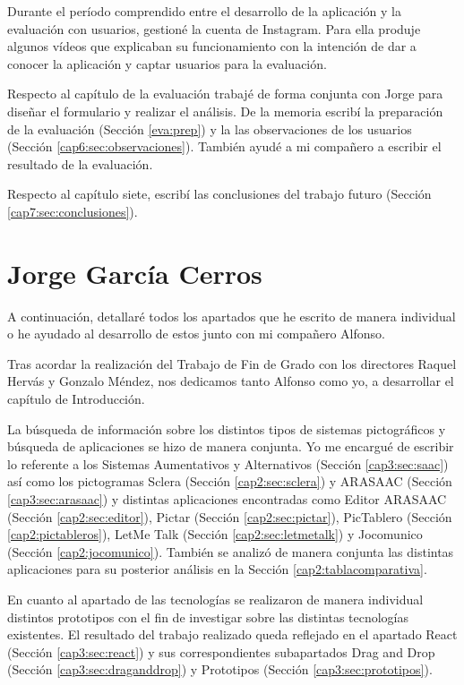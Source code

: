 Durante el período comprendido entre el desarrollo de la aplicación y la evaluación con usuarios, gestioné la cuenta de Instagram. Para ella produje algunos vídeos que explicaban su funcionamiento con la intención de dar a conocer la aplicación y captar usuarios para la evaluación. 

Respecto al capítulo de la evaluación trabajé de forma conjunta con Jorge para diseñar el formulario y realizar el análisis. De la memoria escribí la preparación de la evaluación (Sección \ref{eva:prep}) y la las observaciones de los usuarios (Sección \ref{cap6:sec:observaciones}). También ayudé a mi compañero a escribir el resultado de la evaluación. 

Respecto al capítulo siete, escribí las conclusiones del trabajo futuro (Sección \ref{cap7:sec:conclusiones}).



\section{Jorge García Cerros}

A continuación, detallaré todos los apartados que he escrito de manera individual o he ayudado al desarrollo de estos junto con mi compañero Alfonso.


Tras acordar la realización del Trabajo de Fin de Grado con los directores Raquel Hervás y Gonzalo Méndez, nos dedicamos tanto Alfonso como yo, a desarrollar el capítulo de Introducción.


La búsqueda de información sobre los distintos tipos de sistemas pictográficos y búsqueda de aplicaciones se hizo de manera conjunta. Yo me encargué de escribir lo referente a los Sistemas Aumentativos y Alternativos (Sección \ref{cap3:sec:saac}) así como los pictogramas Sclera (Sección \ref{cap2:sec:sclera}) y ARASAAC (Sección \ref{cap3:sec:arasaac}) y distintas aplicaciones encontradas como Editor ARASAAC (Sección \ref{cap2:sec:editor}), Pictar (Sección \ref{cap2:sec:pictar}), PicTablero (Sección \ref{cap2:pictableros}), LetMe Talk (Sección \ref{cap2:sec:letmetalk}) y Jocomunico (Sección \ref{cap2:jocomunico}). También se analizó de manera conjunta las distintas aplicaciones para su posterior análisis en la Sección \ref{cap2:tablacomparativa}.


En cuanto al apartado de las tecnologías se realizaron de manera individual distintos prototipos con el fin de investigar sobre las distintas tecnologías existentes. El resultado del trabajo realizado queda reflejado en el apartado React (Sección \ref{cap3:sec:react}) y sus correspondientes subapartados Drag and Drop (Sección \ref{cap3:sec:draganddrop}) y Prototipos (Sección \ref{cap3:sec:prototipos}).


